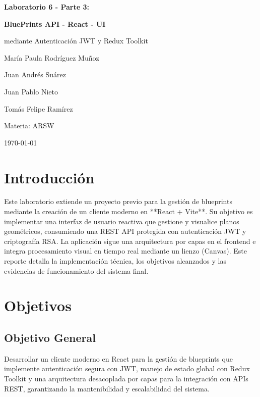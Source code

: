 \documentclass[12pt,a4paper]{article}
\begin{document}
\begin{titlepage}
    \centering
    \vspace*{1.5cm}
    {\huge\bfseries Laboratorio 6 - Parte 3: \par}
    {\huge\bfseries BluePrints API - React - UI \par}
    \vspace{1cm}
    {\Large mediante Autenticación JWT y Redux Toolkit \par}
    \vspace{3cm}
    {\large María Paula Rodríguez Muñoz \par}
    {\large Juan Andrés Suárez \par}
    {\large Juan Pablo Nieto \par}
    {\large Tomás Felipe Ramírez \par}
    \vfill
    \vfill
    {\large Materia: ARSW \par}
    {\large \today \par}
\end{titlepage}

\newpage

\section{Introducción}
Este laboratorio extiende un proyecto previo para la gestión de blueprints mediante la creación de un cliente moderno en **React + Vite**. Su objetivo es implementar una interfaz de usuario reactiva que gestione y visualice planos geométricos, consumiendo una REST API protegida con autenticación JWT y criptografía RSA. La aplicación sigue una arquitectura por capas en el frontend e integra procesamiento visual en tiempo real mediante un lienzo (Canvas). Este reporte detalla la implementación técnica, los objetivos alcanzados y las evidencias de funcionamiento del sistema final.

\section{Objetivos}

\subsection{Objetivo General}
Desarrollar un cliente moderno en React para la gestión de blueprints que implemente autenticación segura con JWT, manejo de estado global con Redux Toolkit y una arquitectura desacoplada por capas para la integración con APIs REST, garantizando la mantenibilidad y escalabilidad del sistema.
\end{document}
